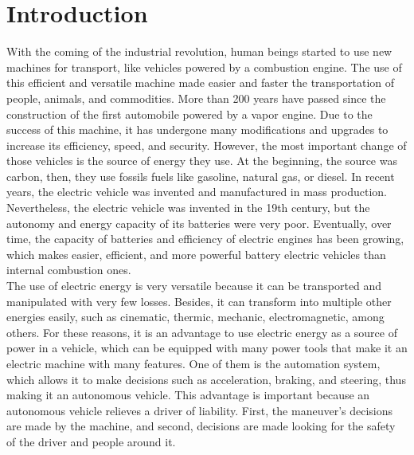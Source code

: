\chapter{Introduction}
With the coming of the industrial revolution, human beings started to use new machines for transport, like vehicles powered by a combustion engine. The use of this efficient and versatile machine made easier and faster the transportation of people, animals, and commodities.  More than 200 years have passed since the construction of the first automobile powered by a vapor engine. Due to the success of this machine, it has undergone many modifications and upgrades to increase its efficiency, speed, and security. However, the most important change of those vehicles is the source of energy they use. At the beginning, the source was carbon, then, they use fossils fuels like gasoline, natural gas, or diesel. In recent years, the electric vehicle was invented and manufactured in mass production. Nevertheless, the electric vehicle was invented in the 19th century, but the autonomy and energy capacity of its batteries were very poor. Eventually, over time, the capacity of batteries and efficiency of electric engines has been growing, which makes easier, efficient, and more powerful battery electric vehicles than internal combustion ones.
\\

The use of electric energy is very versatile because it can be transported and manipulated with very few losses. Besides, it can transform into multiple other energies easily, such as cinematic, thermic, mechanic, electromagnetic, among others. For these reasons, it is an advantage to use electric energy as a source of power in a vehicle, which can be equipped with many power tools that make it an electric machine with many features. One of them is the automation system, which allows it to make decisions such as acceleration, braking, and steering, thus making it an autonomous vehicle. This advantage is important because an autonomous vehicle relieves a driver of liability. First, the maneuver's decisions are made by the machine, and second, decisions are made looking for the safety of the driver and people around it.
\\

